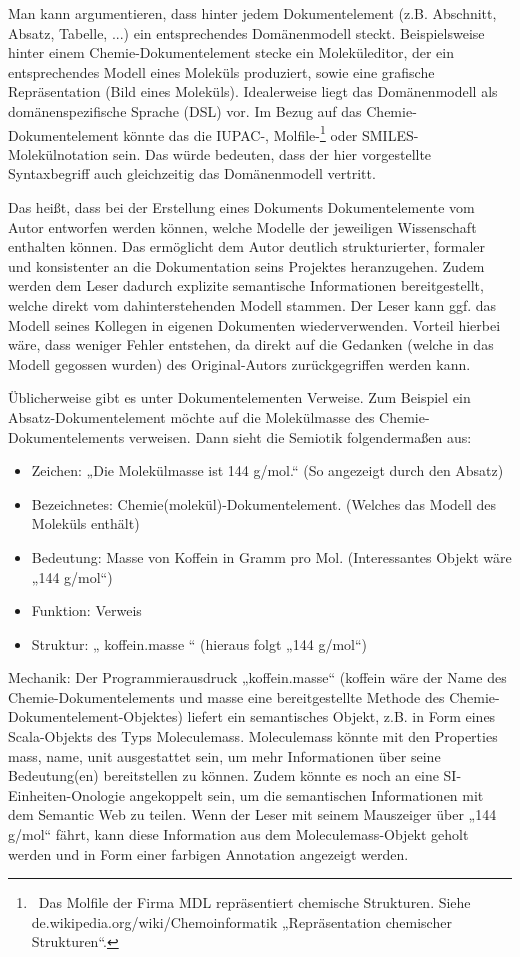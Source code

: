 Man kann argumentieren, dass hinter jedem Dokumentelement (z.B. Abschnitt, Absatz, Tabelle, ...) ein entsprechendes Domänenmodell steckt. Beispielsweise hinter einem Chemie-Dokumentelement stecke ein Moleküleditor, der ein entsprechendes Modell eines Moleküls produziert, sowie eine grafische Repräsentation (Bild eines Moleküls). Idealerweise liegt das Domänenmodell als domänenspezifische Sprache (DSL) vor. Im Bezug auf das Chemie-Dokumentelement könnte das die IUPAC-, Molfile-\footnote{~Das Molfile der Firma MDL repräsentiert chemische Strukturen. Siehe de.wikipedia.org/wiki/Chemoinformatik „Repräsentation chemischer Strukturen“.} oder SMILES-Molekülnotation sein. Das würde bedeuten, dass der hier vorgestellte Syntaxbegriff auch gleichzeitig das Domänenmodell vertritt.

 
Das heißt, dass bei der Erstellung eines Dokuments Dokumentelemente vom Autor entworfen werden können, welche Modelle der jeweiligen Wissenschaft enthalten können. Das ermöglicht dem Autor deutlich strukturierter, formaler und konsistenter an die Dokumentation seins Projektes heranzugehen. Zudem werden dem Leser dadurch explizite semantische Informationen bereitgestellt, welche direkt vom dahinterstehenden Modell stammen. Der Leser kann ggf. das Modell seines Kollegen in eigenen Dokumenten wiederverwenden. Vorteil hierbei wäre, dass weniger Fehler entstehen, da direkt auf die Gedanken (welche in das Modell gegossen wurden) des Original-Autors zurückgegriffen werden kann.

 
Üblicherweise gibt es unter Dokumentelementen Verweise. Zum Beispiel ein Absatz-Dokumentelement möchte auf die Molekülmasse des Chemie-Dokumentelements verweisen. Dann sieht die Semiotik folgendermaßen aus:

 
\begin{itemize}

\item Zeichen: „Die Molekülmasse ist 144 g/mol.“ (So angezeigt durch den Absatz)
\item Bezeichnetes: Chemie(molekül)-Dokumentelement. (Welches das Modell des Moleküls enthält)
\item Bedeutung: Masse von Koffein in Gramm pro Mol. (Interessantes Objekt wäre „144 g/mol“)
\item Funktion: Verweis
\item Struktur: „{ koffein.masse }“ (hieraus folgt „144 g/mol“)
\end{itemize}
 
Mechanik: Der Programmierausdruck „koffein.masse“ (koffein wäre der Name des Chemie-Dokumentelements und masse eine bereitgestellte Methode des Chemie-Dokumentelement-Objektes) liefert ein semantisches Objekt, z.B. in Form eines Scala-Objekts des Typs Moleculemass. Moleculemass könnte mit den Properties mass, name, unit ausgestattet sein, um mehr Informationen über seine Bedeutung(en) bereitstellen zu können. Zudem könnte es noch an eine SI-Einheiten-Onologie angekoppelt sein, um die semantischen Informationen mit dem Semantic Web zu teilen. Wenn der Leser mit seinem Mauszeiger über „144 g/mol“ fährt, kann diese Information aus dem Moleculemass-Objekt geholt werden und in Form einer farbigen Annotation angezeigt werden.

